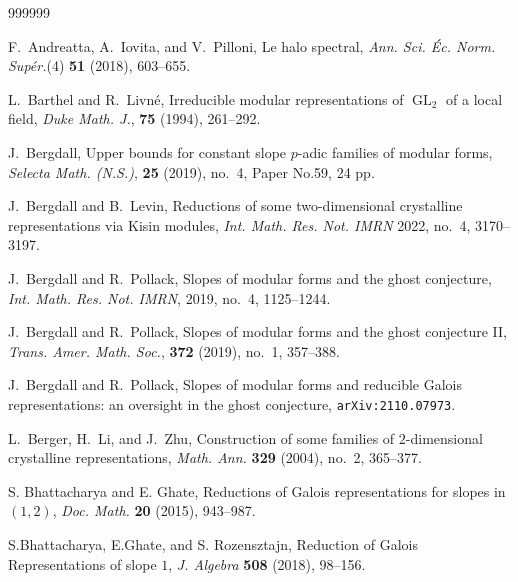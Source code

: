 \documentclass[12pt]{amsart}
\theoremstyle{definition}
\numberwithin{equation}{subsection}
\DeclareMathOperator{\GL}{GL}
\begin{document}
\begin{thebibliography}{999999}



F.~Andreatta, A.~Iovita, and V.~Pilloni, Le halo spectral, {\it Ann. Sci. \'Ec. Norm. Sup\'er.}(4) {\bf 51} (2018), 603--655.

L.~Barthel and R.~Livn\'e, Irreducible modular representations of $\GL_2$ of a local field, {\it Duke Math. J.}, {\bf 75} (1994), 261--292.

J.~Bergdall,
Upper bounds for constant slope $p$-adic families of modular forms, {\it 
Selecta Math. (N.S.)}, {\bf 25} (2019), no.~4, Paper No.59, 24 pp.

J.~Bergdall and B.~Levin,
Reductions of some two-dimensional crystalline representations via Kisin modules, {\it Int. Math. Res. Not. IMRN} 2022, no.~4, 3170--3197.


J.~Bergdall and R.~Pollack, Slopes of modular forms and the ghost
conjecture, {\it Int. Math. Res. Not. IMRN}, 2019, no.~4, 1125--1244.


J.~Bergdall and R.~Pollack, Slopes of modular forms and the ghost conjecture II, {\it Trans. Amer. Math. Soc.}, {\bf 372} (2019), no.~1, 357--388.

J.~Bergdall and R.~Pollack, Slopes of modular forms and reducible Galois representations: an oversight in the ghost conjecture, {\tt arXiv:2110.07973}.

L.~Berger, H.~Li, and J.~Zhu, 
Construction of some families of $2$-dimensional crystalline representations, {\it Math. Ann.} {\bf 329} (2004), no.~2, 365--377.

S. Bhattacharya and E. Ghate, 
Reductions of Galois representations for slopes in $(1,2) $, {\it Doc. Math.} {\bf20} (2015), 943--987.

S.Bhattacharya,  E.Ghate, and S. Rozensztajn, Reduction of Galois Representations of slope $1$, {\it J. Algebra} {\bf 508} (2018), 98--156.


\end{thebibliography}
\end{document}
